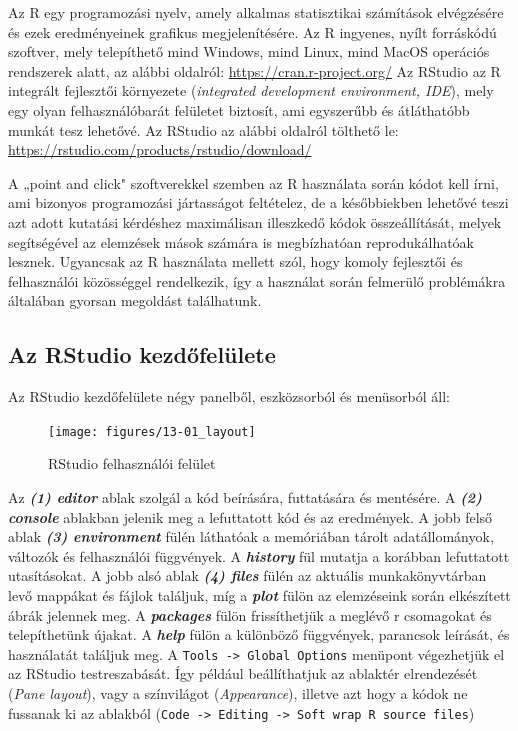 \documentclass[
]{book}
\begin{document}
Az R egy programozási nyelv, amely alkalmas statisztikai számítások
elvégzésére és ezek eredményeinek grafikus megjelenítésére. Az R
ingyenes, nyílt forráskódú szoftver, mely telepíthető mind Windows, mind
Linux, mind MacOS operációs rendszerek alatt, az alábbi oldalról:
\url{https://cran.r-project.org/} Az RStudio az R integrált fejlesztői
környezete (\emph{integrated development environment, IDE}), mely egy
olyan felhasználóbarát felületet biztosít, ami egyszerűbb és átláthatóbb
munkát tesz lehetővé. Az RStudio az alábbi oldalról tölthető le:
\url{https://rstudio.com/products/rstudio/download/}

A „point and click" szoftverekkel szemben az R használata során kódot
kell írni, ami bizonyos programozási jártasságot feltételez, de a
későbbiekben lehetővé teszi azt adott kutatási kérdéshez maximálisan
illeszkedő kódok összeállítását, melyek segítségével az elemzések mások
számára is megbízhatóan reprodukálhatóak lesznek. Ugyancsak az R
használata mellett szól, hogy komoly fejlesztői és felhasználói
közösséggel rendelkezik, így a használat során felmerülő problémákra
általában gyorsan megoldást találhatunk.

\hypertarget{az-rstudio-kezdux151feluxfclete}{%
\subsection{Az RStudio
kezdőfelülete}\label{az-rstudio-kezdux151feluxfclete}}

Az RStudio kezdőfelülete négy panelből, eszközsorból és menüsorból áll:

\begin{figure}

{\centering \texttt{[image: figures/13-01\_layout]} 

}

\caption{RStudio felhasználói felület}\label{fig:unnamed-chunk-105}
\end{figure}

Az \textbf{\emph{(1) editor}} ablak szolgál a kód beírására, futtatására
és mentésére. A \textbf{\emph{(2) console}} ablakban jelenik meg a
lefuttatott kód és az eredmények. A jobb felső ablak \textbf{\emph{(3)
environment}} fülén láthatóak a memóriában tárolt adatállományok,
változók és felhasználói függvények. A \textbf{\emph{history}} fül
mutatja a korábban lefuttatott utasításokat. A jobb alsó ablak
\textbf{\emph{(4) files}} fülén az aktuális munkakönyvtárban levő
mappákat és fájlok találjuk, míg a \textbf{\emph{plot}} fülön az
elemzéseink során elkészített ábrák jelennek meg. A
\textbf{\emph{packages}} fülön frissíthetjük a meglévő r csomagokat és
telepíthetünk újakat. A \textbf{\emph{help}} fülön a különböző
függvények, parancsok leírását, és használatát találjuk meg. A
\texttt{Tools\ -\textgreater{}\ Global\ Options} menüpont végezhetjük el
az RStudio testreszabását. Így például beállíthatjuk az ablaktér
elrendezését (\emph{Pane layout}), vagy a színvilágot
(\emph{Appearance}), illetve azt hogy a kódok ne fussanak ki az ablakból
(\texttt{Code\ -\textgreater{}\ Editing\ -\textgreater{}\ Soft\ wrap\ R\ source\ files})
\end{document}

